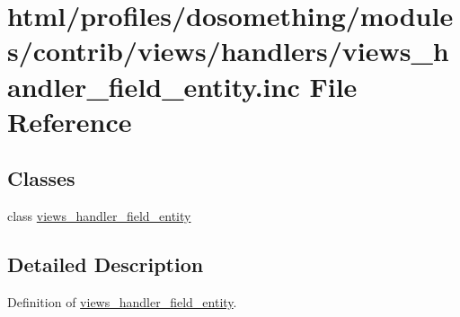 \hypertarget{views__handler__field__entity_8inc}{
\section{html/profiles/dosomething/modules/contrib/views/handlers/views\_\-handler\_\-field\_\-entity.inc File Reference}
\label{views__handler__field__entity_8inc}
}
\subsection*{Classes}
\begin{DoxyCompactItemize}
\item 
class \hyperlink{classviews__handler__field__entity}{views\_\-handler\_\-field\_\-entity}
\end{DoxyCompactItemize}


\subsection{Detailed Description}
Definition of \hyperlink{classviews__handler__field__entity}{views\_\-handler\_\-field\_\-entity}. 